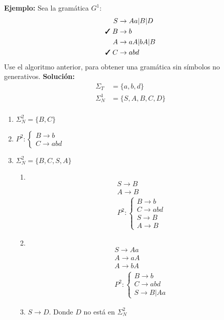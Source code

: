 \textbf{Ejemplo: }Sea la gramática $G^1$:
\begin{align*}
S	&\rightarrow Aa|B|D	\\
\cmark \; B	&\rightarrow b		\\
A	&\rightarrow aA|bA|B\\
\cmark \; C	&\rightarrow abd
\end{align*}
Use el algoritmo anterior, para obtener una gramática sin símbolos no generativos.
\textbf{Solución: }
\begin{align*}
\Sigma_T	&=\{a,b,d\}	\\
\Sigma_N^1	&=\{ S,A,B,C,D\}	\\
\end{align*}
\begin{enumerate}
\item $\Sigma_N^2=\{B,C\}$
\item $P^2: \left \{ \begin{array}{l}
B\rightarrow b	\\
C\rightarrow abd
\end{array}\right.$
\item $\Sigma_N^2=\{ B,C,S,A\}$
	\begin{enumerate}
	\item $\;$\\
	\begin{align*}
	&S\rightarrow B	&\;	\\
	&A\rightarrow B	&\;	\\
	&P^2:\left \{ \begin{array}{l}
		B \rightarrow b	\\
		C \rightarrow abd	\\
		S \rightarrow B	\\
		A \rightarrow B
	\end{array}\right.	&\;
	\end{align*}
	\item $\;$\\
	\begin{align*}
	&S \rightarrow Aa	&\;	\\
	&A \rightarrow aA	&\;	\\
	&A \rightarrow bA	&\;	\\
	&P^2:\left \{ \begin{array}{l}
		B \rightarrow b	\\
		C \rightarrow abd	\\
		S \rightarrow B|Aa
	\end{array}\right.	&\;
	\end{align*}
	\item $S \rightarrow D$. Donde $D$ no está en $\Sigma_N^2$
	\end{enumerate}
\end{enumerate}